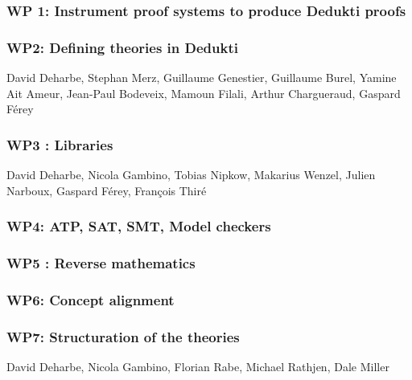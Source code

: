 \subsubsection{WP 1: Instrument proof systems to produce Dedukti proofs}



\subsubsection{WP2: Defining theories in Dedukti}

David Deharbe, Stephan Merz, Guillaume Genestier, Guillaume
Burel, Yamine Ait Ameur, Jean-Paul Bodeveix, Mamoun Filali, Arthur
Chargueraud, Gaspard Férey



\subsubsection{WP3 : Libraries}

David Deharbe, Nicola Gambino, Tobias Nipkow, Makarius Wenzel,
Julien Narboux, Gaspard Férey, François Thiré



\subsubsection{WP4: ATP, SAT, SMT, Model checkers}



\subsubsection{WP5 : Reverse mathematics}



\subsubsection{WP6: Concept alignment}



\subsubsection{WP7: Structuration of the theories}

David Deharbe, Nicola Gambino, Florian Rabe, Michael Rathjen,
Dale Miller



